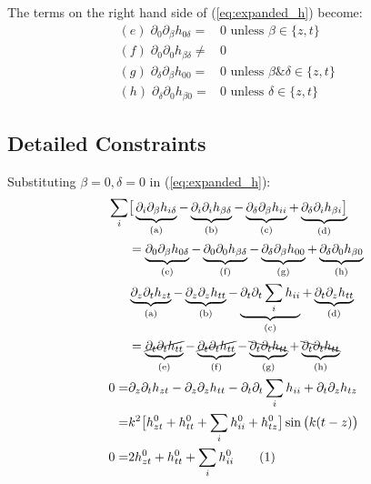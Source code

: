 \documentclass[]{article}
\newcommand\numberthis{\addtocounter{equation}{1}\tag{\theequation}}
\begin{document}
The terms on the right hand side of (\ref{eq:expanded_h}) become:
\begin{align*}
	(e)\;	\partial_0\partial_\beta h_{0\delta}=&0 \text{ unless $\beta\in\{z,t\}$ }\\
	(f)\;	\partial_0\partial_0 h_{\beta\delta}\ne&0\\
	(g)\;	\partial_\delta\partial_\beta h_{00}=&0 \text{ unless $\beta\&\delta\in\{z,t\}$ }\\
	(h)\;	\partial_\delta\partial_0 h_{\beta 0}=&0\text{ unless $\delta\in\{z,t\}$ }&
\end{align*}

\subsection{Detailed Constraints}
Substituting $\beta=0,\delta=0$ in (\ref{eq:expanded_h}):
\begin{align*}
	\sum_i&\big[\underbrace{\partial_i\partial_\beta h_{i\delta}}_\text{(a)} - \underbrace{\partial_i\partial_i h_{\beta\delta}}_\text{(b)} -  \underbrace{\partial_\delta\partial_\beta h_{ii}}_\text{(c)} + \underbrace{\partial_\delta\partial_i h_{\beta i}\big]}_\text{(d)}\\
	&=\underbrace{\partial_0\partial_\beta h_{0\delta}}_\text{(e)}- \underbrace{\partial_0\partial_0 h_{\beta\delta}}_\text{(f)} - \underbrace{\partial_\delta\partial_\beta h_{00}}_\text{(g)} + \underbrace{\partial_\delta\partial_0 h_{\beta 0}}_\text{(h)} \\
	&\underbrace{\partial_z\partial_t h_{zt}}_\text{(a)} - \underbrace{\partial_z\partial_z h_{tt}}_\text{(b)} -  \underbrace{\partial_t\partial_t \sum_i h_{ii}}_\text{(c)} + \underbrace{\partial_t\partial_z h_{tt}}_\text{(d)}\\
	&=\underbrace{\cancel{\partial_t\partial_t h_{tt}}}_\text{(e)}- \underbrace{\cancel{\partial_t\partial_t h_{tt}}}_\text{(f)} - \underbrace{\bcancel{\partial_t\partial_t h_{tt}}}_\text{(g)} + \underbrace{\bcancel{\partial_t\partial_t h_{tt}}}_\text{(h)} \\
	0=&\partial_z\partial_t h_{zt} - \partial_z\partial_z h_{tt} -  \partial_t\partial_t \sum_i h_{ii} + \partial_t\partial_z h_{t z}\\
	=&k^2 \big[h^0_{zt}+h^0_{tt}+\sum_ih^0_{ii}+h^0_{tz}\big] \sin\big(k(t-z)\big)\\
	0=& 2h^0_{zt}+h^0_{tt}+\sum_ih^0_{ii} \numberthis \label{eq:con:00}
	\end{align*}
	
\end{document}
